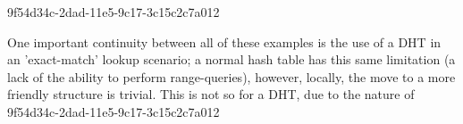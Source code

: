 \documentclass[12pt]{article}
\begin{document}
9f54d34c-2dad-11e5-9c17-3c15c2c7a012\par One important continuity between all of these examples is the use of a DHT in an 'exact-match' lookup scenario; a normal hash table has this same limitation (a lack of the ability to perform range-queries), however, locally, the move to a more friendly structure is trivial. This is not so for a DHT, due to the nature of
\printbibliography
9f54d34c-2dad-11e5-9c17-3c15c2c7a012
\end{document}
